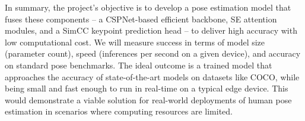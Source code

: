 In summary, the project’s objective is to develop a pose estimation model that fuses these components – a CSPNet-based efficient backbone, SE attention modules, and a SimCC keypoint prediction head – to deliver high accuracy with low computational cost. We will measure success in terms of model size (parameter count), speed (inferences per second on a given device), and accuracy on standard pose benchmarks. The ideal outcome is a trained model that approaches the accuracy of state-of-the-art models on datasets like COCO, while being small and fast enough to run in real-time on a typical edge device. This would demonstrate a viable solution for real-world deployments of human pose estimation in scenarios where computing resources are limited.
